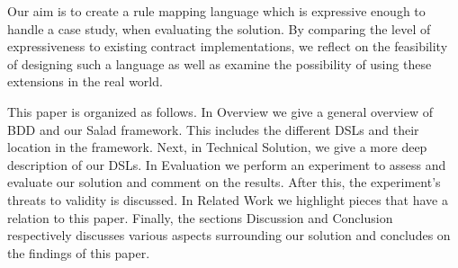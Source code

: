 Our aim is to create a rule mapping language which is expressive enough to handle a case study, when evaluating the solution.
By comparing the level of expressiveness to existing contract implementations, 
we reflect on the feasibility of designing such a language as well as examine the possibility of using these extensions in the real world.

This paper is organized as follows.
In Overview we give a general overview of BDD and our Salad framework.
This includes the different DSLs and their location in the framework.
Next, in Technical Solution, we give a more deep description of our DSLs.
In Evaluation we perform an experiment to assess and evaluate our solution and comment on the results.
After this, the experiment's threats to validity is discussed.
In Related Work we highlight pieces that have a relation to this paper.
Finally, the sections Discussion and Conclusion respectively discusses various aspects surrounding our solution and concludes on the findings of this paper.


